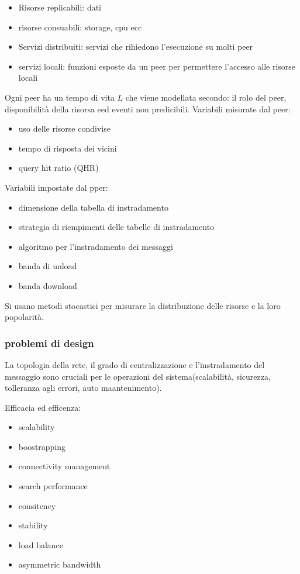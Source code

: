 \begin{itemize}
    \item Risorse replicabili: dati
    \item risorse consuabili: storage, cpu ecc
    \item Servizi distribuiti: servizi che rihiedono l'esecuzione su molti peer
    \item servizi locali: funzioni esposte da un peer per permettere l'accesso alle risorse locali
\end{itemize}

Ogni peer ha un tempo di vita $L$ che viene modellata secondo: il rolo del peer, disponibilità della risorsa eed eventi non predicibili.
Variabili misurate dal peer:
\begin{itemize}
    \item uso delle risorse condivise
    \item tempo di risposta dei vicini
    \item query hit ratio (QHR)
\end{itemize}

Variabili impostate dal pper:
\begin{itemize}
    \item dimensione della tabella di instradamento
    \item strategia di riempimenti delle tabelle di instradamento
    \item algoritmo per l'instradamento dei messaggi
    \item banda di unload
    \item banda download
\end{itemize}

Si usano metodi stocastici per misurare la distribuzione delle risorse e la loro popolarità.
\subsubsection{problemi di design}
La topologia della rete, il grado di centralizzazione e l'instradamento del messaggio sono cruciali per le operazioni del sistema(scalabilità, sicurezza, tolleranza agli errori, auto maantenimento).

Efficacia ed efficenza:
\begin{itemize}
    \item scalability
    \item boostrapping
    \item connectivity management
    \item search performance
    \item consitency
    \item stability
    \item load balance
    \item asymmetric bandwidth
\end{itemize}

